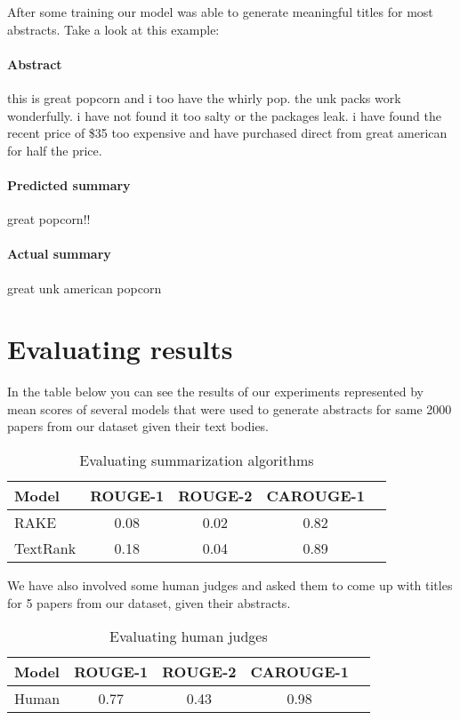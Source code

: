 \documentclass[sigplan]{acmart}
\begin{document}
After some training our model was able to generate meaningful titles for most abstracts. Take a look at this example:

\paragraph{Abstract} this is great popcorn and i too have the whirly pop. the unk packs work wonderfully. i have not found it too salty or the packages leak. i have found the recent price of \$35 too expensive and have purchased direct from great american for half the price.

\paragraph{Predicted summary} great popcorn!!

\paragraph{Actual summary} great unk american popcorn


\section{Evaluating results}
\label{sec:results}

In the table below you can see the results of our experiments represented by mean scores of several models that were used to generate abstracts for same 2000 papers from our dataset given their text bodies.

\begin{table}[H]
\caption{Evaluating summarization algorithms}

\begin{center}
\begin{tabular}{|l|c|c|c|c|}
\hline
\textbf{Model} & \textbf{ROUGE-1} & \textbf{ROUGE-2} & \textbf{CAROUGE-1} \\
\hline
RAKE & 0.08 & 0.02 & 0.82 \\
TextRank & 0.18 & 0.04 & 0.89 \\
\hline
\end{tabular}
\end{center}
\end{table}

We have also involved some human judges and asked them to come up with titles for 5 papers from our dataset, given their abstracts.

\begin{table}[H]
\caption{Evaluating human judges}

\begin{center}
\begin{tabular}{|l|c|c|c|c|}
\hline
\textbf{Model} & \textbf{ROUGE-1} & \textbf{ROUGE-2} & \textbf{CAROUGE-1} \\
\hline
Human & 0.77 & 0.43 & 0.98 \\
\hline
\end{tabular}
\end{center}
\end{table}
\end{document}
